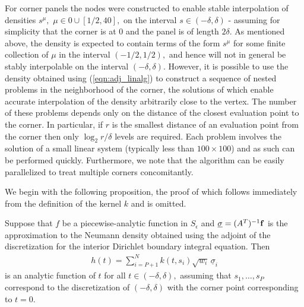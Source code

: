 For corner panels the nodes were constructed to enable stable interpolation of densities $s^\mu,$ $\mu \in 0 \cup [1/2,40],$ on the interval $s \in (-\delta,\delta)$ - assuming for simplicity that the corner is at $0$ and the panel is of length $2 \delta.$ As mentioned above, the density is expected to contain terms of the form $s^\mu$ for some finite collection of $\mu$ in the interval $(-1/2,1/2),$ and hence will not in general be stably interpolable on the interval $(-\delta,\delta).$ However, it is possible to use the density obtained using (\ref{eqn:adj_linalg}) to construct a sequence of nested problems in the neighborhood of the corner, the solutions of which enable accurate interpolation of the density arbitrarily close to the vertex. The number of these problems depends only on the distance of the closest evaluation point to the corner. In particular, if $r$ is the smallest distance of an evaluation point from the corner then only $\log_2 r/\delta$ levels are required. Each problem involves the solution of a small linear system (typically less than $100 \times 100$) and as such can be performed quickly. Furthermore, we note that the algorithm can be easily parallelized to treat multiple corners concomitantly.

We begin with the following proposition, the proof of which follows immediately from the definition of the kernel $k$ and is omitted.
\begin{proposition}
Suppose that $f$ be a piecewise-analytic function in $S_\epsilon$ and  $\underline{\sigma} = (A^T)^{-1} {\bf f}$ is the approximation to the Neumann density obtained using the adjoint of the discretization for the interior Dirichlet boundary integral equation. Then
\begin{align}
h(t) = \sum_{i=P+1}^N k(t,s_i) \sqrt{w_i} \,\underline{\sigma}_i
\end{align}
is an analytic function of $t$ for all $t \in (-\delta,\delta),$ assuming that $s_1,\dots,s_P$ correspond to the discretization of $(-\delta,\delta)$ with the corner point corresponding to $t=0.$
\end{proposition}

